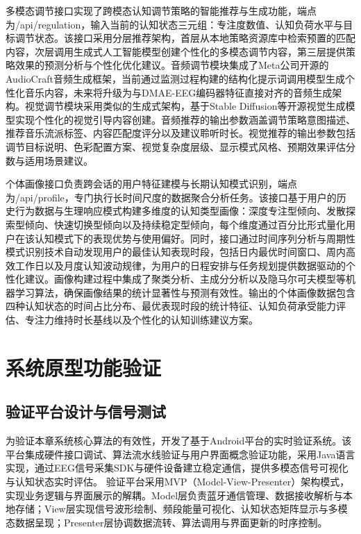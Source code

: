 多模态调节接口实现了跨模态认知调节策略的智能推荐与生成功能，端点为/api/regulation，输入当前的认知状态三元组：专注度数值、认知负荷水平与目标调节状态。该接口采用分层推荐架构，首层从本地策略资源库中检索预置的匹配内容，次层调用生成式人工智能模型创建个性化的多模态调节内容，第三层提供策略效果的预测分析与个性化优化建议。音频调节模块集成了Meta公司开源的AudioCraft音频生成框架\cite{copet2023simple}，当前通过监测过程构建的结构化提示词调用模型生成个性化音乐内容，未来将升级为与DMAE-EEG编码器特征直接对齐的音频生成架构。视觉调节模块采用类似的生成式架构，基于Stable Diffusion等开源视觉生成模型实现个性化的视觉引导内容创建\cite{rombach2022high}。音频推荐的输出参数涵盖调节策略意图描述、推荐音乐流派标签、内容匹配度评分以及建议聆听时长。视觉推荐的输出参数包括调节目标说明、色彩配置方案、视觉复杂度层级、显示模式风格、预期效果评估分数与适用场景建议。

个体画像接口负责跨会话的用户特征建模与长期认知模式识别，端点为/api/profile，专门执行长时间尺度的数据聚合分析任务。该接口基于用户的历史行为数据与生理响应模式构建多维度的认知类型画像：深度专注型倾向、发散探索型倾向、快速切换型倾向以及持续稳定型倾向，每个维度通过百分比形式量化用户在该认知模式下的表现优势与使用偏好。同时，接口通过时间序列分析与周期性模式识别技术自动发现用户的最佳认知表现时段，包括日内最优时间窗口、周内高效工作日以及月度认知波动规律，为用户的日程安排与任务规划提供数据驱动的个性化建议。画像构建过程中集成了聚类分析、主成分分析以及隐马尔可夫模型等机器学习算法，确保画像结果的统计显著性与预测有效性。输出的个体画像数据包含四种认知状态的时间占比分布、最优表现时段的统计特征、认知负荷承受能力评估、专注力维持时长基线以及个性化的认知训练建议方案。


\section{系统原型功能验证}

\subsection{验证平台设计与信号测试}
为验证本章系统核心算法的有效性，开发了基于Android平台的实时验证系统。该平台集成硬件接口调试、算法流水线验证与用户界面概念验证功能，采用Java语言实现，通过EEG信号采集SDK与硬件设备建立稳定通信，提供多模态信号可视化与认知状态实时评估。
验证平台采用MVP（Model-View-Presenter）架构模式，实现业务逻辑与界面展示的解耦。Model层负责蓝牙通信管理、数据接收解析与本地存储；View层实现信号波形绘制、频段能量可视化、认知状态矩阵显示与多模态数据呈现；Presenter层协调数据流转、算法调用与界面更新的时序控制。


